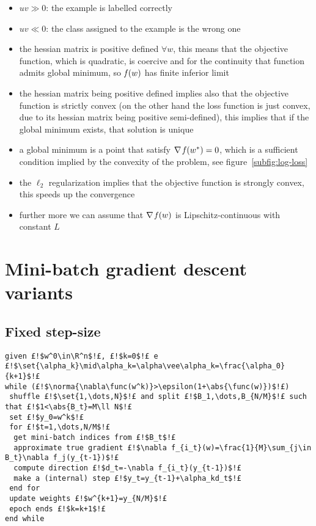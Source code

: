 \cleardoublepage

\begin{itemize}
\item $uv\gg0$: the example is labelled correctly
\item $uv\ll0$: the class assigned to the example is the wrong one
\end{itemize}

\begin{itemize}
\item the hessian matrix is positive defined $\forall w$, this means that the objective function, which is quadratic, is coercive and for the continuity that function admits global minimum, so $\operatorname*{\mathit{f}}(w)$ has finite inferior limit
\item the hessian matrix being positive defined implies also that the objective function is strictly convex (on the other hand the loss function is just convex, due to its hessian matrix being positive semi-defined), this implies that if the global minimum exists, that solution is unique
\item a global minimum is a point that satisfy $\nabla\operatorname*{\mathit{f}}(w^\ast)=0$, which is a sufficient condition implied by the convexity of the problem, see figure~\vref{subfig:log-loss}
\item the $\ell_2$ regularization implies that the objective function is strongly convex, this speeds up the convergence
\item further more we can assume that $\nabla\operatorname*{\mathit{f}}(w)$ is Lipschitz-continuous with constant $L$
\end{itemize}


\cleardoublepage
\section{Mini-batch gradient descent variants}

\subsection{Fixed step-size}

\begin{lstlisting}[style=simple,title={Mini-batch Gradient Descent with fixed or decreasing step-size}]
given £!$w^0\in\R^n$!£, £!$k=0$!£ e £!$\set{\alpha_k}\mid\alpha_k=\alpha\vee\alpha_k=\frac{\alpha_0}{k+1}$!£
while (£!$\norma{\nabla\func(w^k)}>\epsilon(1+\abs{\func(w)})$!£)
 shuffle £!$\set{1,\dots,N}$!£ and split £!$B_1,\dots,B_{N/M}$!£ such that £!$1<\abs{B_t}=M\ll N$!£
 set £!$y_0=w^k$!£
 for £!$t=1,\dots,N/M$!£
  get mini-batch indices from £!$B_t$!£
  approximate true gradient £!$\nabla f_{i_t}(w)=\frac{1}{M}\sum_{j\in B_t}\nabla f_j(y_{t-1})$!£
  compute direction £!$d_t=-\nabla f_{i_t}(y_{t-1})$!£
  make a (internal) step £!$y_t=y_{t-1}+\alpha_kd_t$!£
 end for
 update weights £!$w^{k+1}=y_{N/M}$!£
 epoch ends £!$k=k+1$!£
end while
\end{lstlisting}

